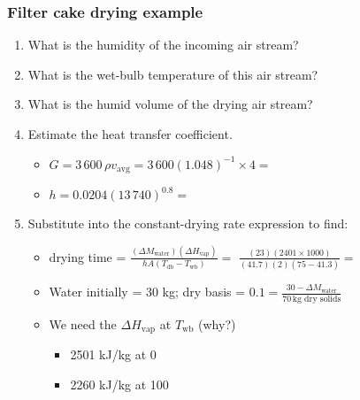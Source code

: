 \begin{frame}\frametitle{Filter cake drying example}
	\begin{enumerate}
		\item	What is the humidity of the incoming air stream? {\scriptsize \color{myOrange}{[$\psi$ = 0.04 kg water/kg dry air]}}
		\item	What is the wet-bulb temperature of this air stream? {\scriptsize {}}		
		\item	What is the humid volume of the drying air stream? {\scriptsize \color{myOrange}{[$T_\text{db}=348$K, $v_H = 1.048 \text{m}^3\text{/kg}$]}}
		\item	Estimate the heat transfer coefficient.
		\begin{itemize}
			\item	$G = 3\,600\, \rho v_\text{avg} = 3\,600 (1.048)^{-1} \times 4 =$  {}
			\item	$h = 0.0204 (13\,740)^{0.8} =$ {}
		\end{itemize}
		\item	Substitute into the constant-drying rate expression to find:
		\begin{itemize}
			\item	drying time = $\displaystyle  \frac{(\Delta M_\text{water}) (\Delta H_\text{vap})}{hA(T_\text{db} - T_\text{wb})} =$ {\scriptsize $\displaystyle \frac{(23)(2401\times 1000)}{(41.7)(2)(75-41.3)} =$} {\tiny {}}

			\vspace{12pt}
			\item	Water initially = 30 kg; dry basis = $0.1 = \displaystyle \frac{30 - \Delta M_\text{water}}{70\,\text{kg dry solids}}$
			\item	We need the $\Delta H_\text{vap}$ at $T_\text{wb}$ (why?) {\small \color{myOrange}{[2401 kJ/kg]}}
			\begin{itemize}
				\item	2501 kJ/kg at 0\degC
				\item	2260 kJ/kg at 100\degC
			\end{itemize}
		\end{itemize}
		
	\end{enumerate}
\end{frame}

